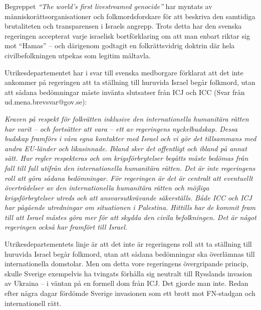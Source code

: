 Begreppet \textit{“The world’s first livestreamed genocide”} har myntats av människorättsorganisationer och folkmordsforskare för att beskriva den samtidiga brutaliteten och transparensen i Israels angrepp. Trots detta har den svenska regeringen accepterat varje israelisk bortförklaring om att man enbart riktar sig mot \enquote{Hamas} – och därigenom godtagit en folkrättsvidrig doktrin där hela civilbefolkningen utpekas som legitim måltavla.





Utrikesdepartementet har i svar till svenska medborgare förklarat att det inte ankommer på regeringen 
att ta ställning till huruvida Israel begår folkmord, utan att sådana bedömningar måste invänta slutsatser 
från ICJ och ICC (Svar från ud.mena.brevsvar@gov.se):

\textit{Kraven på respekt för folkrätten inklusive den internationella humanitära rätten har varit – och fortsätter att vara – ett av regeringens nyckelbudskap. Dessa budskap framförs i våra egna kontakter med Israel och vi gör det tillsammans med andra EU-länder och likasinnade. Ibland sker det offentligt och ibland på annat sätt. Hur regler respekteras och om krigsförbrytelser begåtts måste bedömas från fall till fall utifrån den internationella humanitära rätten. Det är inte regeringens roll att göra sådana bedömningar. För regeringen är det är centralt att eventuellt överträdelser av den internationella humanitära rätten och möjliga krigsförbrytelser utreds och att ansvarsutkrävande säkerställs. Både ICC och ICJ har pågående utredningar om situationen i Palestina. Hittills har de kommit fram till att Israel måstes göra mer för att skydda den civila befolkningen. Det är något regeringen också har framfört till Israel.}



Utrikesdepartementets linje är att det inte är regeringens roll att ta ställning till huruvida Israel begår folkmord, utan att sådana bedömningar ska överlämnas till internationella domstolar. Men om detta vore regeringens övergripande princip, skulle Sverige exempelvis ha tvingats förhålla sig neutralt till Rysslands invasion av Ukraina – i väntan på en formell dom från ICJ. Det gjorde man inte. Redan efter några dagar fördömde Sverige invasionen som ett brott mot FN-stadgan och internationell rätt.  

